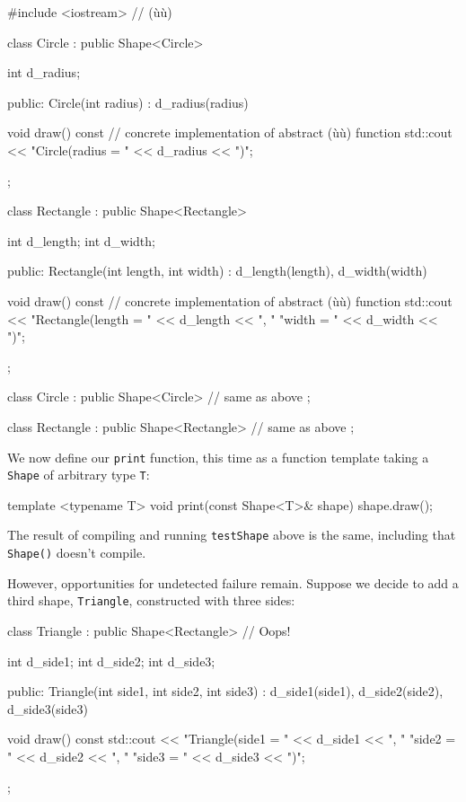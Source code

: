 \begin{emcppshiddenlisting}[emcppsbatch=e7]
#include <iostream>  // (ù{}ù)

class Circle : public Shape<Circle>
{
    int d_radius;

public:
    Circle(int radius) : d_radius(radius) { }

    void draw() const  // concrete implementation of abstract (ù{}ù) function
    {
        std::cout << "Circle(radius = " << d_radius << ")\n";
    }
};

class Rectangle : public Shape<Rectangle>
{
    int d_length;
    int d_width;

public:
    Rectangle(int length, int width) : d_length(length), d_width(width) { }

    void draw() const  // concrete implementation of abstract (ù{}ù) function
    {
        std::cout << "Rectangle(length = " << d_length << ", "
                                "width = " << d_width  << ")\n";
    }
};
\end{emcppshiddenlisting}
\begin{emcppslisting}[emcppsbatch=e7,emcppsignore={expanded as hidden listing}]
class Circle : public Shape<Circle>
{
    // same as above
};

class Rectangle : public Shape<Rectangle>
{
    // same as above
};
\end{emcppslisting}

\noindent We now define our \lstinline!print! function, this time as a function
template taking a \lstinline!Shape! of arbitrary type \lstinline!T!:

\begin{emcppslisting}[emcppsbatch=e7]
template <typename T>
void print(const Shape<T>& shape)
{
    shape.draw();
}
\end{emcppslisting}

\noindent The result of compiling and running \lstinline!testShape! above is the
same, including that \lstinline!Shape()! doesn't compile.

However, opportunities for undetected failure remain. Suppose we decide
to add a third shape, \lstinline!Triangle!, constructed with three sides:

\begin{emcppslisting}[emcppsbatch=e7]
class Triangle : public Shape<Rectangle>  // Oops!
{
    int d_side1;
    int d_side2;
    int d_side3;

public:
    Triangle(int side1, int side2, int side3)
        : d_side1(side1), d_side2(side2), d_side3(side3) { }

    void draw() const
    {
        std::cout << "Triangle(side1 = " << d_side1 << ", "
                              "side2 = " << d_side2 << ", "
                              "side3 = " << d_side3 << ")\n";
    }
};
\end{emcppslisting}

